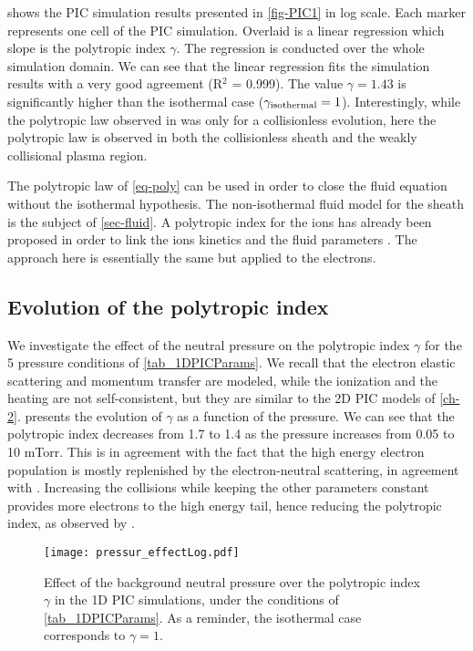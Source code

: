      shows the PIC simulation results presented in \cref{fig-PIC1} in log scale.
    Each marker represents one cell of the PIC simulation.
    Overlaid is a linear regression which slope is the polytropic index $\gamma$.
    The regression is conducted over the whole simulation domain.
    We can see that the linear regression fits the simulation results with a very good agreement (R$^2$ = 0.999).
    The value $\gamma = 1.43$ is significantly higher than the isothermal case ($\gamma_{\rm isothermal} = 1$).
    Interestingly, while the polytropic law observed in \citet{zhang2016} was only for a collisionless evolution, here the polytropic law is observed in both the collisionless sheath and the weakly collisional plasma region.

    The polytropic law of \cref{eq-poly} can be used in order to close the fluid equation without the isothermal hypothesis.
    The non-isothermal fluid model for the sheath is the subject of \cref{sec-fluid}.
    A polytropic index for the ions has already been proposed in order to link the ions kinetics and the fluid parameters \citep{kuhn2006,jelic2007}.
    The approach here is essentially the same but applied to the electrons.


  \subsection{Evolution of the polytropic index}
    \label{subsec-presurseffect}
    We investigate the effect of the neutral pressure on the polytropic index $\gamma$ for the 5 pressure conditions of \cref{tab_1DPICParams}.
    We recall that the electron elastic scattering and momentum transfer are modeled, while the ionization and the heating are not self-consistent, but they are similar to the \ac{2D} \ac{PIC} models of \cref{ch-2}.
     presents the evolution of $\gamma$ as a function of the pressure.
    We can see that the polytropic index decreases from 1.7 to 1.4 as the pressure increases from 0.05 to 10 mTorr.
    This is in agreement with the fact that the high energy electron population is mostly replenished by the electron-neutral scattering, in agreement with \citet{kaganovich2007}.
    Increasing the collisions while keeping the other parameters constant provides more electrons to the high energy tail, hence reducing the polytropic index, as observed by \citet{zhang2016}.

    \begin{figure}[!htb]
      \centering
      \texttt{[image: pressur\_effectLog.pdf]}
      \caption{Effect of the background neutral pressure over the polytropic index $\gamma$ in the \acs{1D} \acs{PIC} simulations, under the conditions of \cref{tab_1DPICParams}. As a reminder, the isothermal case corresponds to $\gamma=1$.}
      \label{fig-p}
    \end{figure}

